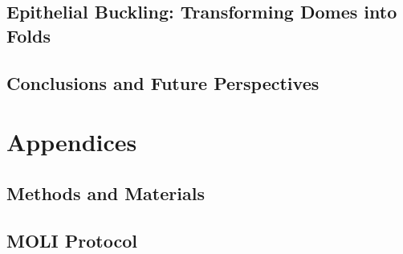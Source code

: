 \documentclass[11pt, final, a4paper, twoside, openright]{book}
\begin{document}
	\renewcommand{\thesection}{8.\arabic{section}}
	\hypertarget{epithelial-buckling-transforming-domes-into-folds}{%
	\chapter{Epithelial Buckling: Transforming Domes into Folds}\label{epithelial-buckling-transforming-domes-into-folds}}
	
	
	\renewcommand{\thesection}{9.\arabic{section}}
	\hypertarget{chapter-9}{%
	\chapter{Conclusions and Future Perspectives}\label{chapter-9}}
	
	


	\part{Appendices}
	\begin{appendices}
		\renewcommand{\thesection}{A.\arabic{section}}
		\chapter{Methods and Materials}   \label{appendix_1}
		

		\renewcommand{\thesection}{B.\arabic{section}}
		\chapter{MOLI Protocol}   \label{appendix_2}
		
	\end{appendices}
	
	\backmatter
	
	
\end{document}
